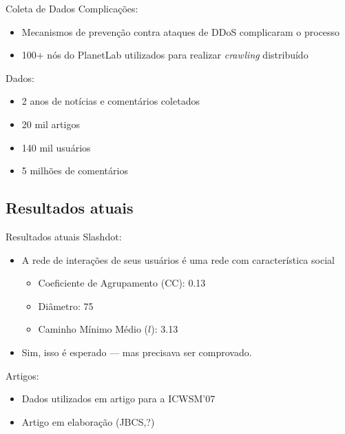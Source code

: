 \documentclass[compress]{beamer}
\begin{document}
    \begin{frame}{Coleta de Dados}
        Complicações:
        \begin{itemize}
            \item Mecanismos de prevenção contra ataques de DDoS complicaram o
            processo
            \item 100+ nós do PlanetLab utilizados para realizar
            \emph{crawling} distribuído
        \end{itemize}

        Dados:
        \begin{itemize}
            \item 2 anos de notícias e comentários coletados
            \item 20 mil artigos
            \item 140 mil usuários
            \item 5 milhões de comentários
        \end{itemize}
    \end{frame}

\subsection{Resultados atuais}

    \begin{frame}{Resultados atuais}
        Slashdot:
        \begin{itemize}
            \item A rede de interações de seus usuários é uma rede
            com característica social
            \begin{itemize}
                \item Coeficiente de Agrupamento (CC): 0.13
                \item Diâmetro: 75
                \item Caminho Mínimo Médio ($l$): 3.13
            \end{itemize}
            \pause

            \item Sim, isso é esperado --- mas precisava ser comprovado.
        \end{itemize}

	Artigos:
        \begin{itemize}
            \item Dados utilizados em artigo para a ICWSM'07
            \item Artigo em elaboração (JBCS,?)
        \end{itemize}
    \end{frame}
\end{document}
